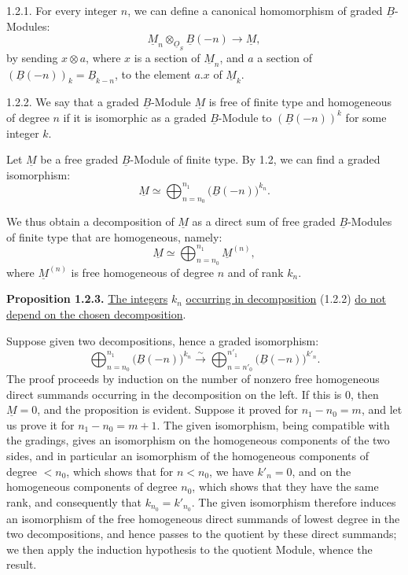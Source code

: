 1.2.1. For every integer \(n\), we can define a canonical homomorphism of graded \(\underline{B}\)-Modules:
\begin{equation}\tag{1.2.1}
  \underline{M}_n\otimes_{\underline{O}_S} \underline{B}(-n)\longrightarrow \underline{M},
\end{equation}
by sending \(x\otimes a\), where \(x\) is a section of \(\underline{M}_n\), and \(a\) a section of \((\underline{B}(-n))_k=\underline{B}_{k-n}\), to the element \(a.x\) of \(\underline{M}_k\).

1.2.2. We say that a graded \(\underline{B}\)-Module \(\underline{M}\) is free of finite type and homogeneous of degree \(n\) if it is isomorphic as a graded \(\underline{B}\)-Module to \((\underline{B}(-n))^k\) for some integer \(k\).

%
Let \(\underline{M}\) be a free graded \(\underline{B}\)-Module of finite type. By 1.2, we can find a graded isomorphism:
\begin{equation}\tag{1.2.2}
  \underline{M}\simeq \bigoplus_{n=n_0}^{n_1} \bigl(\underline{B}(-n)\bigr)^{k_n}.
\end{equation}

We thus obtain a decomposition of \(\underline{M}\) as a direct sum of free graded \(\underline{B}\)-Modules of finite type that are homogeneous, namely:
\[
  \underline{M}\simeq \bigoplus_{n=n_0}^{n_1}\underline{M}^{(n)},
\]
where \(\underline{M}^{(n)}\) is free homogeneous of degree \(n\) and of rank \(k_n\).

\textbf{Proposition 1.2.3.} \uline{The integers} \(k_n\) \uline{occurring in decomposition} (1.2.2) \uline{do not depend on the chosen decomposition}.

Suppose given two decompositions, hence a graded isomorphism:
\[
  \bigoplus_{n=n_0}^{n_1}\bigl(\underline{B}(-n)\bigr)^{k_n}\xrightarrow{\sim}
  \bigoplus_{n=n'_0}^{n'_1}\bigl(\underline{B}(-n)\bigr)^{k'_n}.
\]
The proof proceeds by induction on the number of nonzero free homogeneous direct summands occurring in the decomposition on the left. If this is \(0\), then \(\underline{M}=0\), and the proposition is evident. Suppose it proved for \(n_1-n_0=m\), and let us prove it for \(n_1-n_0=m+1\). The given isomorphism, being compatible with the gradings, gives an isomorphism on the homogeneous components of the two sides, and in particular an isomorphism of the homogeneous components of degree \(<n_0\), which shows that for \(n<n_0\), we have \(k'_n=0\), and on the homogeneous components of degree \(n_0\), which shows that they have the same rank, and consequently that \(k_{n_0}=k'_{n_0}\). The given isomorphism therefore induces an isomorphism of the free homogeneous direct summands of lowest degree in the two decompositions, and hence passes to the quotient by these direct summands; we then apply the induction hypothesis to the quotient Module, whence the result.

